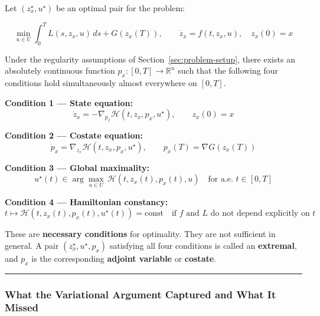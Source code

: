 \documentclass{article}
\begin{document}
\begin{mathrequirementsbox}
Let $(z_x^\star, u^\star)$ be an optimal pair for the problem:

$$\min_{u \in U} \int_0^T L(s, z_x, u)\, ds + G(z_x(T)), \qquad \dot{z}_x = f(t, z_x, u), \quad z_x(0) = x$$

Under the regularity assumptions of Section~\ref{sec:problem-setup}, there exists an absolutely continuous function $p_x : [0,T] \to \mathbb{R}^n$ such that the following four conditions hold simultaneously almost everywhere on $[0,T]$.

\textbf{Condition 1 — State equation:}
\begin{equation}\tag{3}
\dot{z}_x = -\nabla_{p_x} \mathcal{H}(t, z_x, p_x, u^\star), \qquad z_x(0) = x
\label{eq:pmp-state-tagged}
\end{equation}

\textbf{Condition 2 — Costate equation:}
\begin{equation}\tag{4}
\dot{p}_x = \nabla_{z_x} \mathcal{H}(t, z_x, p_x, u^\star), \qquad p_x(T) = \nabla G(z_x(T))
\label{eq:pmp-costate-tagged}
\end{equation}

\textbf{Condition 3 — Global maximality:}
\begin{equation}\tag{5}
u^\star(t) \in \arg\max_{u \in U}\, \mathcal{H}(t, z_x(t), p_x(t), u) \quad \text{for a.e. } t \in [0,T]
\label{eq:pmp-max-tagged}
\end{equation}

\textbf{Condition 4 — Hamiltonian constancy:}
\begin{equation}
t \mapsto \mathcal{H}(t, z_x(t), p_x(t), u^\star(t)) = \text{const} \quad \text{if } f \text{ and } L \text{ do not depend explicitly on } t
\label{eq:hamiltonian-constancy}
\end{equation}

These are \textbf{necessary conditions} for optimality. They are not sufficient in general. A pair $(z_x^\star, u^\star, p_x)$ satisfying all four conditions is called an \textbf{extremal}, and $p_x$ is the corresponding \textbf{adjoint variable} or \textbf{costate}.
\end{mathrequirementsbox}

\medskip\hrule\medskip

\subsubsection{What the Variational Argument Captured and What It Missed}
\end{document}
